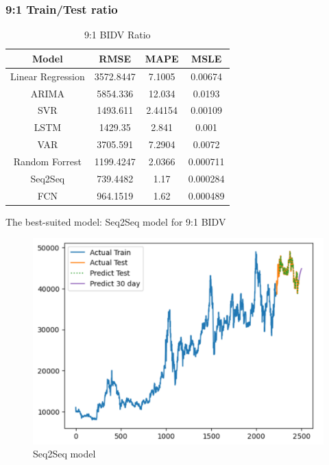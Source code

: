\documentclass{ieeeojies}
\begin{document}
\subsubsection{9:1 Train/Test ratio}
\begin{table}[H]
    \centering
    \begin{tabular}{|c|c|c|c|}
    \hline
    Model & \textbf{RMSE} & \textbf{MAPE} & \textbf{MSLE}\\
    \hline
    Linear Regression & 3572.8447 & 7.1005 & 0.00674 \\
    \hline
    ARIMA & 5854.336 & 12.034 & 0.0193 \\
    \hline
    SVR & 1493.611 & 2.44154 & 0.00109 \\
    \hline
    LSTM & 1429.35 & 2.841 & 0.001 \\
    \hline
    VAR & 3705.591 & 7.2904 & 0.0072 \\
    \hline
    Random Forrest & 1199.4247 & 2.0366 & 0.000711 \\
    \hline
    \rowcolor{red!10}
    Seq2Seq & 739.4482 & 1.17 & 0.000284 \\
    \hline
    FCN & 964.1519 & 1.62 & 0.000489 \\
    \hline
    \end{tabular}
    \caption{9:1 BIDV Ratio}
    \label{tab:my_label}
\end{table}
The best-suited model: Seq2Seq model for 9:1 BIDV
\begin{figure}[H]
    \centering
    \includegraphics[width=1\linewidth]{bidv_s2s_91.png}
    \caption{Seq2Seq model}
    \label{fig:enter-label}
\end{figure}
\end{document}
